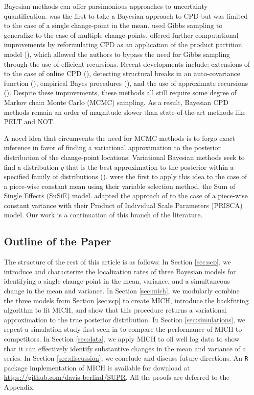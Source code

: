 Bayesian methods can offer parsimonious approaches to uncertainty quantification. \cite{Smith75} was the first to take a Bayesian approach to CPD but was limited to the case of a single change-point in the mean. \cite{Stephens94} used Gibbs sampling to generalize to the case of multiple change-points. \cite{Barry93} offered further computational improvements by reformulating CPD as an application of the product partition model (\citealp{Hartigan90, Barry92}), which allowed the authors to bypass the need for Gibbs sampling through the use of efficient recursions. Recent developments include: extensions of \cite{Barry93} to the case of online CPD (\citealp{Fearnhead06, Adams07}), detecting structural breaks in an auto-covariance function (\citealp{Preuss15}), empirical Bayes procedures (\citealp{Liu17}), and the use of approximate recursions (\citealp{Cappello21}). Despite these improvements, these methods all still require some degree of Markov chain Monte Carlo (MCMC) sampling. As a result, Bayesian CPD methods remain an order of magnitude slower than state-of-the-art methods like PELT and NOT.

A novel idea that circumvents the need for MCMC methods is to forgo exact inference in favor of finding a variational approximation to the posterior distribution of the change-point locations. Variational Bayesian methods seek to find a distribution $q$ that is the best approximation to the posterior within a specified family of distributions (\citealp{Jordan99, Bishop06, Wainwright08, Blei17}). \cite{Wang20} were the first to apply this idea to the case of a piece-wise constant mean using their variable selection method, the Sum of Single Effects (SuSiE) model. \cite{Cappello22} adapted the approach of \citeauthor{Wang20} to the case of a piece-wise constant variance with their Product of Individual Scale Parameters (PRISCA) model. Our work is a continuation of this branch of the literature.


\subsection{Outline of the Paper}

The structure of the rest of this article is as follows: In Section \ref{sec:scp}, we introduce and characterize the localization rates of three Bayesian models for identifying a single change-point in the mean, variance, and a simultaneous change in the mean and variance. In Section \ref{sec:mich}, we modularly combine the three models from Section \ref{sec:scp} to create MICH, introduce the backfitting algorithm to fit MICH, and show that this procedure returns a variational approximation to the true posterior distribution. In Section \ref{sec:simulations}, we repeat a simulation study first seen in \cite{Pein17} to compare the performance of MICH to competitors. In Section \ref{sec:data}, we apply MICH to oil well log data to show that it can effectively identify substantive changes in the mean and variance of a series. In Section \ref{sec:discussion}, we conclude and discuss future directions. An \texttt{R} package implementation of MICH is available for download at \url{https://github.com/davis-berlind/SUPR}. All the proofs are deferred to the Appendix. 

